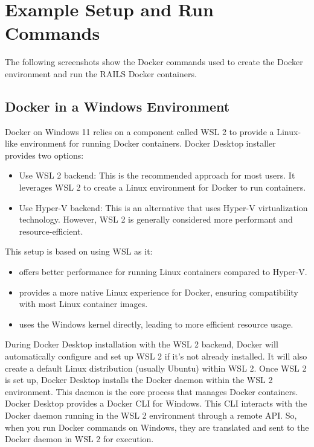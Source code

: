\chapter{Example Setup and Run Commands}
\label{app:examplecommands}
The following screenshots show the Docker commands used to create the Docker environment and run the \ac{RAILS} Docker containers.
\section{Docker in a Windows Environment}
\label{sec:win-cmds}
Docker on Windows 11 relies on a component called \ac{WSL 2} to provide a Linux-like environment for running Docker containers. Docker Desktop installer provides two options:
\begin{itemize}
    \item Use \ac{WSL 2} backend: This is the recommended approach for most users. It leverages \ac{WSL 2} to create a Linux environment for Docker to run containers.
    \item Use Hyper-V backend: This is an alternative that uses Hyper-V virtualization technology. However, \ac{WSL 2} is generally considered more performant and resource-efficient.   
\end{itemize}
This setup is based on using WSL as it:
\begin{itemize}
    \item offers better performance for running Linux containers compared to Hyper-V.
    \item provides a more native Linux experience for Docker, ensuring compatibility with most Linux container images.
    \item uses the Windows kernel directly, leading to more efficient resource usage.
\end{itemize}
During Docker Desktop installation with the \ac{WSL 2} backend, Docker will automatically configure and set up \ac{WSL 2} if it's not already installed. It will also create a default Linux distribution (usually Ubuntu) within \ac{WSL 2}. Once \ac{WSL 2} is set up, Docker Desktop installs the Docker daemon within the \ac{WSL 2} environment. This daemon is the core process that manages Docker containers.
Docker Desktop provides a Docker \ac{CLI} for Windows. This \ac{CLI} interacts with the Docker daemon running in the \ac{WSL 2} environment through a remote API. So, when you run Docker commands on Windows, they are translated and sent to the Docker daemon in \ac{WSL 2} for execution.\vspace{5mm} \\
